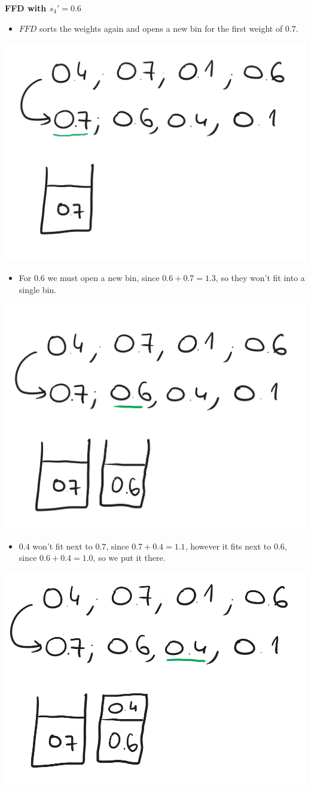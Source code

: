 \textbf{FFD with $s_4'=0.6$}


\begin{itemize}
    \item $FFD$ sorts the weights again and opens a new bin for the first weight of $0.7$.
\end{itemize}

\begin{center}
    \includegraphics[width=0.5\linewidth]{10/01/ffd_alt_01.png}
\end{center}

\begin{itemize}
    \item For $0.6$ we must open a new bin, since $0.6+0.7=1.3$, so they won't fit into a single bin.
\end{itemize}

\begin{center}
    \includegraphics[width=0.5\linewidth]{10/01/ffd_alt_02.png}
\end{center}

\begin{itemize}
    \item $0.4$ won't fit next to $0.7$, since $0.7+0.4=1.1$, however it fits next to $0.6$, since $0.6+0.4=1.0$, so we put it there.
\end{itemize}

\begin{center}
    \includegraphics[width=0.5\linewidth]{10/01/ffd_alt_03.png}
\end{center}

